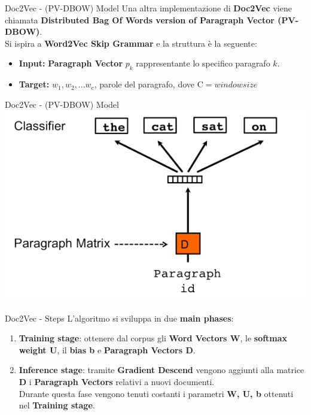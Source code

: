 \documentclass[british]{beamer}
\begin{document}
\begin{frame}{Doc2Vec - (PV-DBOW) Model}
	Una altra implementazione di \textbf{Doc2Vec} viene chiamata \textbf{Distributed Bag Of Words version of Paragraph Vector (PV-DBOW)}.\\
	Si ispira a \textbf{Word2Vec Skip Grammar} e la struttura \`{e} la seguente:
	\begin{itemize}
		\item \textbf{Input:} \textbf{Paragraph Vector} $p_k$ rappresentante lo specifico paragrafo $k$.
		\item \textbf{Target:} $w_{1},w_{2},...w_{c}$, parole del paragrafo, dove $\mathrm{C} = window size$
	\end{itemize}
\end{frame}

\begin{frame}{Doc2Vec - (PV-DBOW) Model}
	\includegraphics[width=0.9\linewidth]{./Imgs/doc2vec-skipgram.png}
\end{frame}

\begin{frame}{Doc2Vec - Steps}
	L'algoritmo si sviluppa in due \textbf{main phases}:
	\begin{enumerate}
		\item \textbf{Training stage}: ottenere dal corpus gli \textbf{Word Vectors W}, le \textbf{softmax weight U}, il \textbf{bias b} e \textbf{Paragraph Vectors D}.
		\item \textbf{Inference stage}: tramite \textbf{Gradient Descend} vengono aggiunti alla matrice \textbf{D} i \textbf{Paragraph Vectors} relativi a nuovi documenti.\\ Durante questa fase vengono tenuti costanti i parametri \textbf{W, U, b} ottenuti nel \textbf{Training stage}.
	\end{enumerate}
\end{frame}	
	
\end{document}
